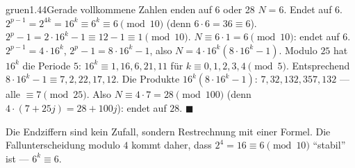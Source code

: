 \begin{loesungkarte}{gruen}{1.44}{Gerade vollkommene Zahlen enden auf 6 oder 28}
$N = 6$. Endet auf $6$.
$2^{p-1} = 2^{4k} = 16^{k}\equiv6^{k}\equiv6\pmod{10}$ (denn $6\cdot6 = 36\equiv6$). $2^{p} - 1 = 2\cdot16^{k} - 1\equiv12 - 1\equiv1\pmod{10}$. $N\equiv6\cdot1 = 6\pmod{10}$: endet auf $6$.
$2^{p-1} = 4\cdot16^{k}$, $2^{p} - 1 = 8\cdot16^{k} - 1$, also $N = 4\cdot16^{k}(8\cdot16^{k} - 1)$. Modulo $25$ hat $16^{k}$ die Periode $5$: $16^{k}\equiv1, 16, 6, 21, 11$ für $k\equiv0, 1, 2, 3, 4\pmod5$. Entsprechend $8\cdot16^{k} - 1\equiv7, 2, 22, 17, 12$. Die Produkte $16^{k}(8\cdot16^{k} - 1)$: $7, 32, 132, 357, 132$ --- alle $\equiv7\pmod{25}$. Also $N\equiv4\cdot7 = 28\pmod{100}$ (denn $4\cdot(7 + 25j) = 28 + 100j$): endet auf $28$. $\blacksquare$
\begin{mitnehmen}\kastentext
Die Endziffern sind kein Zufall, sondern Restrechnung mit einer Formel. Die Fallunterscheidung modulo $4$ kommt daher, dass $2^{4} = 16\equiv6\pmod{10}$ \enquote{stabil} ist --- $6^{k}\equiv6$.
\end{mitnehmen}
\end{loesungkarte}

